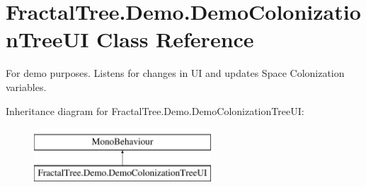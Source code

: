 \hypertarget{class_fractal_tree_1_1_demo_1_1_demo_colonization_tree_u_i}{}\section{Fractal\+Tree.\+Demo.\+Demo\+Colonization\+Tree\+UI Class Reference}
\label{class_fractal_tree_1_1_demo_1_1_demo_colonization_tree_u_i}


For demo purposes. Listens for changes in UI and updates Space Colonization variables.  


Inheritance diagram for Fractal\+Tree.\+Demo.\+Demo\+Colonization\+Tree\+UI\+:\begin{figure}[H]
\begin{center}
\leavevmode
\includegraphics[height=2.000000cm]{class_fractal_tree_1_1_demo_1_1_demo_colonization_tree_u_i}
\end{center}
\end{figure}
